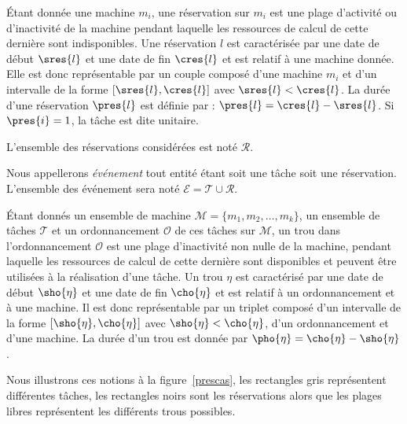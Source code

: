\documentclass[a4paper,9pt]{report}
\begin{document}
\begin{ndf}[Réservation]
    Étant donnée une machine $m_i$, une réservation sur $m_i$ est une plage d'activité ou
    d'inactivité de la machine pendant laquelle les ressources de calcul de cette dernière sont
    indisponibles. Une réservation $l$ est caractérisée par une date de début $\sres{l}$ et une date de fin
    $\cres{l}$ et est relatif à une machine donnée. Elle est donc représentable par un couple composé
    d'une machine $m_i$ et d'un intervalle de la forme $[\sres{l}, \cres{l}]$ avec $\sres{l} < \cres{l}$.
    La durée d'une réservation $\pres{l}$ est définie par :  $\pres{l} = \cres{l} - \sres{l}$. Si
    $\pres{i} = 1$, la tâche est dite unitaire.

    L'ensemble des réservations considérées est noté $\mathcal{R}$.
\end{ndf}

\begin{nrmq}
    Nous appellerons \emph{événement} tout entité étant soit une tâche soit une réservation.
    L'ensemble des événement sera noté $\mathcal{E} = \mathcal{T} \cup \mathcal{R}$.
\end{nrmq}

\begin{ndf}[Trou]
    Étant donnés un ensemble de machine $\mathcal{M} = \{m_1, m_2, \dots, m_k\}$, un ensemble de
    tâches $\mathcal{T}$ et un ordonnancement $\mathcal{O}$ de ces tâches sur $\mathcal{M}$, un trou
    dans l'ordonnancement $\mathcal{O}$ est une plage d'inactivité non nulle de la machine, pendant
    laquelle les ressources de calcul de cette dernière sont disponibles et peuvent être utilisées à
    la réalisation d'une tâche. Un trou $\eta$ est caractérisé par une date de début $\sho{\eta}$ et
    une date de fin $\cho{\eta}$ et est relatif à un ordonnancement et à une machine. Il est donc
    représentable par un triplet composé d'un intervalle de la forme $[\sho{\eta}, \cho{\eta}]$ avec
    $\sho{\eta} < \cho{\eta}$, d'un ordonnancement et d'une machine. La durée d'un trou est donnée
    par $\pho{\eta} = \cho{\eta} - \sho{\eta}$.
\end{ndf}

\begin{nrmq}
    Nous illustrons ces notions à la figure~\ref{prescas}, les rectangles gris
    représentent différentes tâches, les rectangles noirs sont les réservations alors que les plages
    libres représentent les différents trous possibles.
\end{nrmq}
\end{document}
